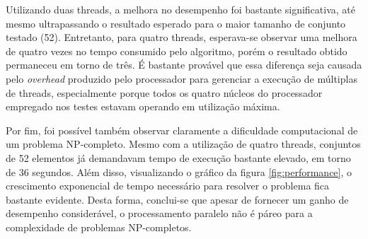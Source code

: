 \documentclass[12pt]{article}
\begin{document}
Utilizando duas threads, a melhora no desempenho foi bastante significativa, até mesmo ultrapassando o resultado esperado para o maior tamanho de conjunto testado (52). Entretanto, para quatro threads, esperava-se observar uma melhora de quatro vezes no tempo consumido pelo algoritmo, porém o resultado obtido permaneceu em torno de três. É bastante provável que essa diferença seja causada pelo \textit{overhead} produzido pelo processador para gerenciar a execução de múltiplas de threads, especialmente porque todos os quatro núcleos do processador empregado nos testes estavam operando em utilização máxima.

Por fim, foi possível também observar claramente a dificuldade computacional de um problema NP-completo. Mesmo com a utilização de quatro threads, conjuntos de 52 elementos já demandavam tempo de execução bastante elevado, em torno de 36 segundos. Além disso, visualizando o gráfico da figura \ref{fig:performance}, o crescimento exponencial de tempo necessário para resolver o problema fica bastante evidente. Desta forma, conclui-se que apesar de fornecer um ganho de desempenho considerável, o processamento paralelo não é páreo para a complexidade de problemas NP-completos.



\end{document}

